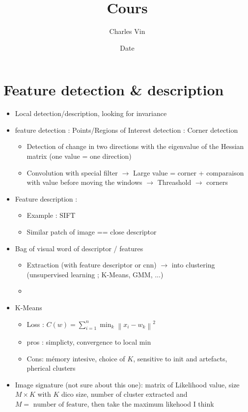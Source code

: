 \documentclass{article}
\title{Cours}
\author{Charles Vin}
\date{Date}
\theoremstyle{plain}%
\theoremstyle{definition}
\theoremstyle{remark}
\begin{document}
\maketitle


\section{Feature detection \& description}
\begin{itemize}
    \item Local detection/description, looking for invariance
    \item feature detection : Points/Regions of Interest detection : Corner detection \begin{itemize}
        \item Detection of change in two directions with the eigenvalue of the Hessian matrix (one value = one direction)
        \item Convolution with special filter $\rightarrow$ Large value = corner + comparaison with value before moving the windows $\rightarrow$ Threashold $\rightarrow$ corners
    \end{itemize}
    \item Feature description : \begin{itemize}
        \item Example : SIFT
        \item Similar patch of image == close descriptor
    \end{itemize}
    \item Bag of visual word of descriptor / features \begin{itemize}
        \item Extraction (with feature descriptor or cnn) $\rightarrow$ into clustering (unsupervised learning ; K-Means, GMM, ...)
        \item
    \end{itemize}
    \item K-Means \begin{itemize}
        \item Loss : $ C(w) = \sum_{i=1}^{n} \min _k \left\| x_i - w_k  \right\| ^2 $
        \item pros : simplicty, convergence to local min
        \item Cons: mémory intesive, choice of $ K $, sensitive to init and artefacts, pherical clusters
    \end{itemize}
    \item Image signature (not sure about this one): matrix of Likelihood value, size $ M \times K $ with $ K  $ dico size, number of cluster extracted and $ M = \text{ number of feature} $, then take the maximum likehood I think
\end{itemize}
\end{document}

